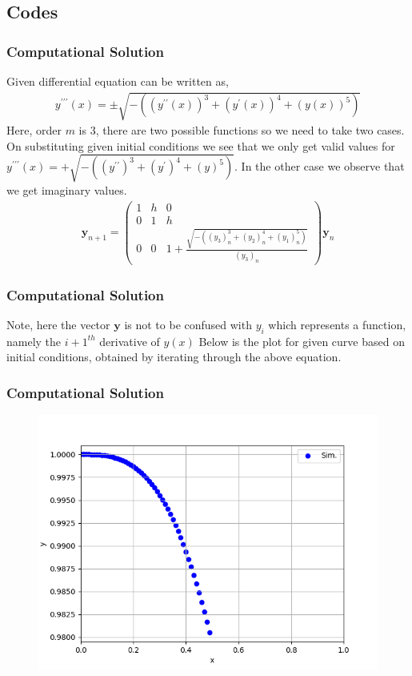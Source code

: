 \documentclass{beamer}
\providecommand{\brak}[1]{\ensuremath{\left(#1\right)}}
\theoremstyle{remark}
\newcommand{\myvec}[1]{\ensuremath{\begin{pmatrix}#1\end{pmatrix}}}
\let\vec\mathbf
\numberwithin{equation}{section}
\begin{document}
		\subsection{Codes}
		\begin{frame}[fragile]
			\frametitle{Computational Solution}
Given differential equation can be written as,
      {\small
\begin{align}
    y^{\prime \prime \prime}\brak{x} = \pm \sqrt{-\brak{\brak{y^{\prime \prime}\brak{x}}^3 + \brak{y^{\prime}\brak{x}}^4 + \brak{y\brak{x}}^5 }}
\end{align}
      }
      Here, order $m$ is 3, there are two possible functions so we need to take two cases. On substituting given initial conditions we see that we only get valid values for {\small$y^{\prime \prime \prime}\brak{x} = + \sqrt{-\brak{\brak{y^{\prime \prime}}^3 + \brak{y^{\prime}}^4 + \brak{y}^5 }}$.} In the other case we observe that we get imaginary values.
      {\small
      \begin{align}
  \vec{y}_{n+1}=\myvec{1 & h & 0 \\ 0 & 1 & h \\ 0 & 0 & 1+\frac{\sqrt{-\brak{\brak{y_3}_n^3 + \brak{y_2}_n^4 + \brak{y_1}_n^5}} }{\brak{y_3}_n}}\vec{y}_{n}
\end{align}
      }
		\end{frame}
		\begin{frame}[fragile]
			\frametitle{Computational Solution}
Note, here the vector $\vec{y}$ is not to be confused with $y_i$ which represents a function, namely the ${i+1}^{th}$ derivative of $y\brak{x}$ Below is the plot for given curve  based on initial conditions, obtained by iterating through the above equation.
		\end{frame}
		\begin{frame}[fragile]
			\frametitle{Computational Solution}
			\begin{figure}[h!]
				\centering
				\includegraphics[width=1\columnwidth]{figs/fig.png}
				\label{stemplot}
			\end{figure}
	\end{frame}
	
\end{document}
